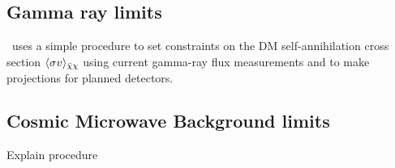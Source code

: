 % 
% 
% 

\subsection{Gamma ray limits}

\hazma\ uses a simple procedure to set constraints on the DM self-annihilation cross section \(\langle \sigma v \rangle_{\bar{\chi} \chi}\) using current gamma-ray flux measurements and to make projections for planned detectors.

\subsection{Cosmic Microwave Background limits}

Explain procedure

